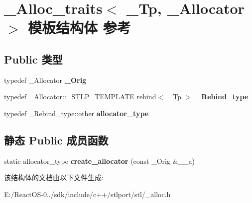 \hypertarget{struct___alloc__traits}{}\section{\+\_\+\+Alloc\+\_\+traits$<$ \+\_\+\+Tp, \+\_\+\+Allocator $>$ 模板结构体 参考}
\label{struct___alloc__traits}
\subsection*{Public 类型}
\begin{DoxyCompactItemize}
\item 
\mbox{\label{struct___alloc__traits_ac704c81c59a96bf31ee18ab1c6b5a98b}} 
typedef \+\_\+\+Allocator {\bfseries \+\_\+\+Orig}
\item 
\mbox{\label{struct___alloc__traits_a3a7e61b1c5614c5ac2f5f4e127ea25fd}} 
typedef \+\_\+\+Allocator\+::\+\_\+\+S\+T\+L\+P\+\_\+\+T\+E\+M\+P\+L\+A\+TE rebind$<$ \+\_\+\+Tp $>$ {\bfseries \+\_\+\+Rebind\+\_\+type}
\item 
\mbox{\label{struct___alloc__traits_a1c011f1bd366b64ac0164b3d77d1f2b1}} 
typedef \+\_\+\+Rebind\+\_\+type\+::other {\bfseries allocator\+\_\+type}
\end{DoxyCompactItemize}
\subsection*{静态 Public 成员函数}
\begin{DoxyCompactItemize}
\item 
\mbox{\label{struct___alloc__traits_ae078934d2def4ba9ace50b753f6fa91f}} 
static allocator\+\_\+type {\bfseries create\+\_\+allocator} (const \+\_\+\+Orig \&\+\_\+\+\_\+a)
\end{DoxyCompactItemize}


该结构体的文档由以下文件生成\+:\begin{DoxyCompactItemize}
\item 
E\+:/\+React\+O\+S-\/0../sdk/include/c++/stlport/stl/\+\_\+alloc.\+h\end{DoxyCompactItemize}

